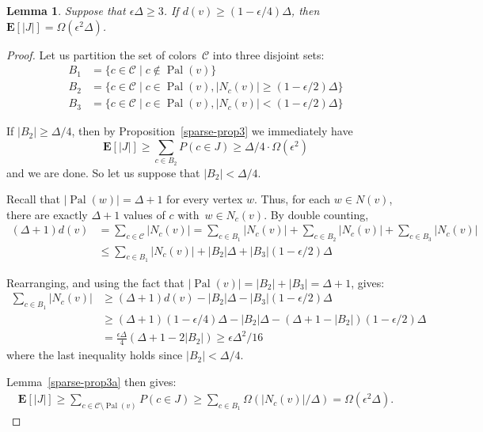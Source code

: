 \documentclass[11pt]{amsart}
\newtheorem{lemma}[theorem]{Lemma}
\newcommand{\bE}{\ensuremath{\mathbf{E}}}
\newcommand{\pal}{\operatorname{Pal}}
\begin{document}
\begin{lemma}
\label{sparse-prop4}
Suppose that $\epsilon \Delta \geq 3$.  If $d(v) \geq (1 - \epsilon/4) \Delta$, then $\bE [ |J| ] = \Omega(\epsilon^2 \Delta)$.
\end{lemma}
\begin{proof}
Let us partition the set of colors~$\mathcal C$ into three disjoint sets:
\begin{align*}
B_1 &= \{ c \in \mathcal C \mid c \notin \pal(v) \} \\
B_2 &= \{ c \in \mathcal C \mid c \in \pal(v), |N_c(v)| \geq (1 - \epsilon/2) \Delta \} \\
B_3 &= \{ c \in \mathcal C \mid c \in \pal(v), |N_c(v)| < (1 - \epsilon/2) \Delta \}
\end{align*}

If $|B_2| \geq \Delta/4$, then by Proposition~\ref{sparse-prop3} we immediately have 
$$
\bE[ |J| ] \geq \sum_{c \in B_2} P(c \in J) \geq \Delta/4 \cdot \Omega(\epsilon^2)
$$
and we are done. So let us suppose that $|B_2| < \Delta/4$. 

Recall that $|\pal(w)| = \Delta+1$ for every vertex $w$. Thus, for each $w \in N(v)$, there are exactly $\Delta+1$ values of $c$ with~$w \in N_c(v)$. By double counting, 
\begin{align*}
(\Delta+1) d(v) &= \sum_{c \in \mathcal C} |N_c(v)| = \sum_{c \in B_1} |N_c(v)| + \sum_{c \in B_2} |N_c(v)| + \sum_{c \in B_3} |N_c(v)| \\
&\leq \sum_{c \in B_1 } |N_c(v)| + |B_2| \Delta + |B_3| (1 - \epsilon/2) \Delta
\end{align*}

Rearranging, and using the fact that $|\pal(v)| = |B_2| + |B_3| = \Delta+1$, gives:
\begin{align*}
\sum_{c \in B_1} |N_c(v)| &\geq (\Delta + 1) d(v) - |B_2|\Delta - |B_3|(1-\epsilon/2)\Delta \\
&\geq (\Delta + 1)(1-\epsilon/4)\Delta - |B_2|\Delta - (\Delta + 1 - |B_2|)(1-\epsilon/2)\Delta \\
&= \tfrac{\epsilon \Delta}{4} ( \Delta + 1 - 2 |B_2|) \geq \epsilon \Delta^2/16
\end{align*}
where the last inequality holds since $|B_2| < \Delta/4$.

Lemma~\ref{sparse-prop3a} then gives:
\begin{align*}
\bE[ |J| ] \geq \sum_{c \in \mathcal C \setminus \pal(v)} P(c \in J) \geq \sum_{c \in B_1} \Omega( |N_c(v)|/\Delta ) = \Omega( \epsilon^2 \Delta ).
\end{align*}
\end{proof}
\end{document}
